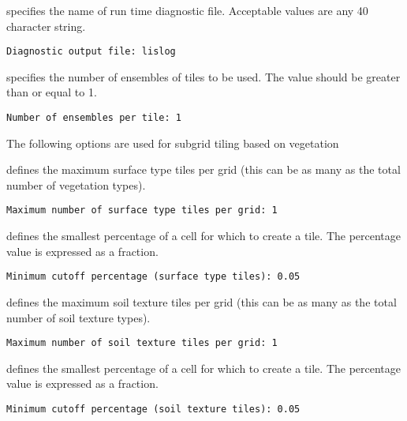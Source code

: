  
  specifies the name of run time
 diagnostic file. 
 Acceptable values are any 40 character string.
 

 \begin{Verbatim}[frame=single]
Diagnostic output file: lislog
 \end{Verbatim}

 
  specifies the number of 
 ensembles of tiles to be used. The value should be greater than
 or equal to 1. 
 

 \begin{Verbatim}[frame=single]
Number of ensembles per tile: 1
 \end{Verbatim}

 
 The following options are used for subgrid tiling based on vegetation

  defines the
 maximum surface type tiles per grid (this can be as many as the total
 number of vegetation types). 
 

 \begin{Verbatim}[frame=single]
Maximum number of surface type tiles per grid: 1
 \end{Verbatim}

 
  defines the
 smallest percentage of a cell for which to create a tile.
 The percentage value is expressed as a fraction.
 

 \begin{Verbatim}[frame=single]
Minimum cutoff percentage (surface type tiles): 0.05
 \end{Verbatim}

 
  defines the
 maximum soil texture tiles per grid (this can be as many as the total
 number of soil texture types). 
 

 \begin{Verbatim}[frame=single]
Maximum number of soil texture tiles per grid: 1
 \end{Verbatim}

 
  defines the
 smallest percentage of a cell for which to create a tile.
 The percentage value is expressed as a fraction.
 

 \begin{Verbatim}[frame=single]
Minimum cutoff percentage (soil texture tiles): 0.05
 \end{Verbatim}

